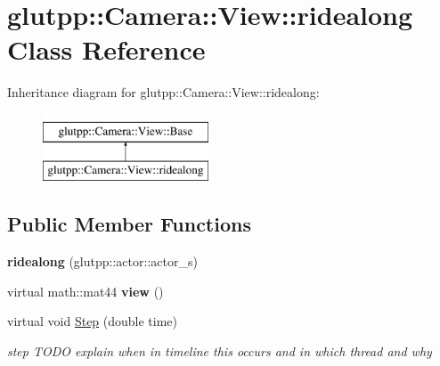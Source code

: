 \hypertarget{classglutpp_1_1Camera_1_1View_1_1ridealong}{\section{glutpp\-:\-:\-Camera\-:\-:\-View\-:\-:ridealong \-Class \-Reference}
\label{classglutpp_1_1Camera_1_1View_1_1ridealong}
}
\-Inheritance diagram for glutpp\-:\-:\-Camera\-:\-:\-View\-:\-:ridealong\-:\begin{figure}[H]
\begin{center}
\leavevmode
\includegraphics[height=2.000000cm]{classglutpp_1_1Camera_1_1View_1_1ridealong}
\end{center}
\end{figure}
\subsection*{\-Public \-Member \-Functions}
\begin{DoxyCompactItemize}
\item 
\hypertarget{classglutpp_1_1Camera_1_1View_1_1ridealong_ae6b8552cf2fc6ca0892276225f367483}{{\bfseries ridealong} (glutpp\-::actor\-::actor\-\_\-s)}\label{classglutpp_1_1Camera_1_1View_1_1ridealong_ae6b8552cf2fc6ca0892276225f367483}

\item 
\hypertarget{classglutpp_1_1Camera_1_1View_1_1ridealong_a501bf0c20a3a707bb0ebad0dcb994519}{virtual math\-::mat44 {\bfseries view} ()}\label{classglutpp_1_1Camera_1_1View_1_1ridealong_a501bf0c20a3a707bb0ebad0dcb994519}

\item 
\hypertarget{classglutpp_1_1Camera_1_1View_1_1ridealong_a881a7ae916cb2f71344f04617fa30e19}{virtual void \hyperlink{classglutpp_1_1Camera_1_1View_1_1ridealong_a881a7ae916cb2f71344f04617fa30e19}{\-Step} (double time)}\label{classglutpp_1_1Camera_1_1View_1_1ridealong_a881a7ae916cb2f71344f04617fa30e19}

\begin{DoxyCompactList}\small\item\em step \-T\-O\-D\-O explain when in timeline this occurs and in which thread and why \end{DoxyCompactList}\end{DoxyCompactItemize}
